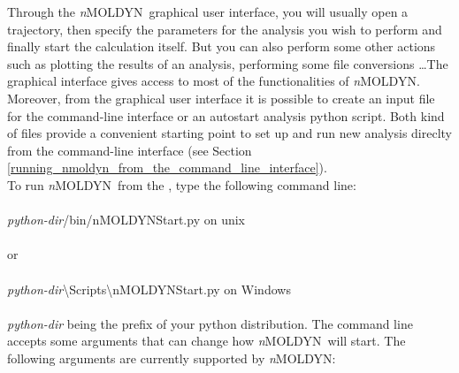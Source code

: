 \documentclass[a4paper,11pt]{report}
\newcommand{\NMOLDYN}{\textit{n}MOLDYN}
\begin{document}
Through the \NMOLDYN\ graphical user interface, you will usually open a trajectory, then specify the parameters 
for the analysis you wish to perform and finally start the calculation itself. But you can also perform some other 
actions such as plotting the results of an analysis, performing some file conversions \ldots The graphical interface gives 
access to most of the functionalities of \NMOLDYN. 
Moreover, from the graphical user interface it is possible to create an input file for the command-line interface or an 
autostart analysis python script. Both kind of files provide a convenient starting point to set up and run new analysis direclty 
from the command-line interface (see Section \ref{running_nmoldyn_from_the_command_line_interface}).
\\
To run \NMOLDYN\ from the \GUI , type the following command line:
\\
\\
{\ttfamily \textit{python-dir}/bin/nMOLDYNStart.py} on unix
\\\\
or
\\\\
{\ttfamily \textit{python-dir}\textbackslash Scripts\textbackslash nMOLDYNStart.py} on Windows
\\
\\
\textit{python-dir} being the prefix of your python distribution. The command line accepts some arguments that can 
change how \NMOLDYN\ will start. The following arguments are currently supported by \NMOLDYN:
\end{document}
